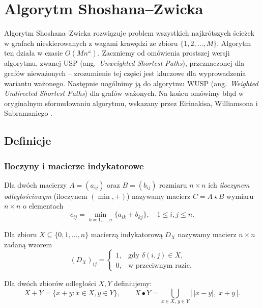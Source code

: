 \chapter{Algorytm Shoshana--Zwicka}

Algorytm Shoshana--Zwicka \cite{ShoshanZwick1999} rozwiązuje problem wszystkich najkrótszych ścieżek w grafach nieskierowanych z wagami krawędzi ze zbioru $\{1, 2, \ldots, M\}$. Algorytm ten działa w czasie $O(Mn^\omega)$.
Zaczniemy od omówienia prostszej wersji algorytmu, zwanej USP (ang.\ \emph{Unweighted Shortest Paths}), przeznaczonej dla grafów nieważonych -- zrozumienie tej części jest kluczowe dla wyprowadzenia wariantu ważonego. Następnie uogólnimy ją do algorytmu WUSP (ang.\ \emph{Weighted Undirected Shortest Paths}) dla grafów ważonych. Na końcu omówimy błąd w oryginalnym sformułowaniu algorytmu, wskazany przez Eirinakisa, Williamsona i Subramaniego \cite{Eirinakis2017}.

\section{Definicje}
\subsection{Iloczyny i macierze indykatorowe}

\begin{definicja}
Dla dwóch macierzy $A = (a_{ij})$ oraz $B = (b_{ij})$ rozmiaru $n \times n$ ich \emph{iloczynem odległościowym} (iloczynem $(\min, +)$) nazywamy macierz $C = A \star B$ wymiaru $n \times n$ o elementach
\[
c_{ij} = \min_{k = 1, \ldots, n} \{a_{ik} + b_{kj}\}, \quad 1 \leq i, j \leq n.
\]
\end{definicja}

\begin{definicja}
Dla zbioru $X \subseteq \{0, 1, \ldots, n\}$ macierzą indykatorową $D_X$ nazywamy macierz $n \times n$ zadaną wzorem
\[
(D_X)_{ij} = \begin{cases} 1, & \text{gdy } \delta(i, j) \in X,\\ 0, & \text{w przeciwnym razie}. \end{cases}
\]
\end{definicja}

\begin{definicja}
Dla dwóch zbiorów odległości $X, Y$ definiujemy:
\[
X + Y = \{x + y : x \in X, y \in Y\}, \qquad X \bullet Y = \bigcup_{x \in X,\, y \in Y} \bigl[\, |x - y|,\; x + y \,\bigr].
\]
\end{definicja}

